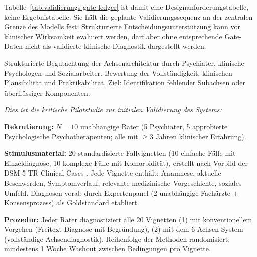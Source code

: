 \documentclass[11pt,a4paper]{article}
\begin{document}
Tabelle~\ref{tab:validierungs-gate-ledger} ist damit eine Designanforderungstabelle, keine Ergebnistabelle. Sie h\"alt die geplante Validierungssequenz an der zentralen Grenze des Modells fest: Strukturierte Entscheidungsunterst\"utzung kann vor klinischer Wirksamkeit evaluiert werden, darf aber ohne entsprechende Gate-Daten nicht als validierte klinische Diagnostik dargestellt werden.

\begin{description}[style=nextline, leftmargin=1.5cm, font=\bfseries]
\item[Phase~1: Expertenbegutachtung (N=10--15)] Strukturierte Begutachtung der Achsenarchitektur durch Psychiater, klinische Psychologen und Sozialarbeiter. Bewertung der Vollst\"andigkeit, klinischen Plausibilit\"at und Praktikabilit\"at. Ziel: Identifikation fehlender Subachsen oder \"uberfl\"ussiger Komponenten.

\item[Phase~2: Inter-Rater-Reliabilit\"atsstudie mit Fallvignetten (N=10 Rater, 20 Vignetten)] \textit{Dies ist die kritische Pilotstudie zur initialen Validierung des Systems:}

\textbf{Rekrutierung:} $N = 10$ unabh\"angige Rater (5 Psychiater, 5 approbierte Psychologische Psychotherapeuten; alle mit $\geq 3$ Jahren klinischer Erfahrung).

\textbf{Stimulusmaterial:} 20 standardisierte Fallvignetten (10 einfache F\"alle mit Einzeldiagnose, 10 komplexe F\"alle mit Komorbidit\"at), erstellt nach Vorbild der DSM-5-TR Clinical Cases \citep{BarnhillDSM5ClinicalCases}. Jede Vignette enth\"alt: Anamnese, aktuelle Beschwerden, Symptomverlauf, relevante medizinische Vorgeschichte, soziales Umfeld. Diagnosen vorab durch Expertenpanel (2 unabh\"angige Fach\"arzte + Konsensprozess) als Goldstandard etabliert.

\textbf{Prozedur:} Jeder Rater diagnostiziert alle 20 Vignetten (1) mit konventionellem Vorgehen (Freitext-Diagnose mit Begr\"undung), (2) mit dem 6-Achsen-System (vollst\"andige Achsendiagnostik). Reihenfolge der Methoden randomisiert; mindestens 1 Woche Washout zwischen Bedingungen pro Vignette.


\end{description}
\end{document}
